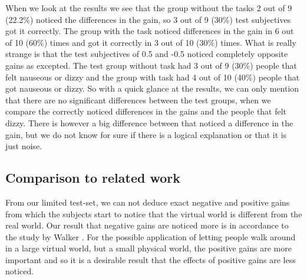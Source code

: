 When we look at the results we see that the group without the tasks 2 out of 9 (22.2\%) noticed the differences in the gain, so 3 out of 9 (30\%)  test subjectives got it correctly.  The group with the task noticed differences in the gain in 6 out of 10 (60\%) times and got it correctly in 3 out of 10 (30\%) times. What is really strange is that the test subjectives of 0.5 and -0.5 noticed completely opposite gains as excepted. The test group without task had 3 out of 9 (30\%) people that felt nauseous or dizzy and the group with task had 4 out of 10 (40\%) people that got nauseous or dizzy. So with a quick glance at the results, we can only mention that there are no significant differences between the test groups, when we compare the correctly noticed differences in the gains and the people that felt dizzy. There is however a big difference between that noticed a difference in the gain, but we do not know for sure if there is a logical explanation or that it is just noise.
\subsection{Comparison to related work}
From our limited test-set, we can not deduce exact negative and positive gains from which the subjects start to notice that the virtual world is different from the real world.
Our result that negative gains are noticed more is in accordance to the study by Walker \cite{jwalker}.
For the possible application of letting people walk around in a large virtual world, but a small physical world, the positive gains are more important and so it is a desirable result that the effects of positive gains are less noticed.
